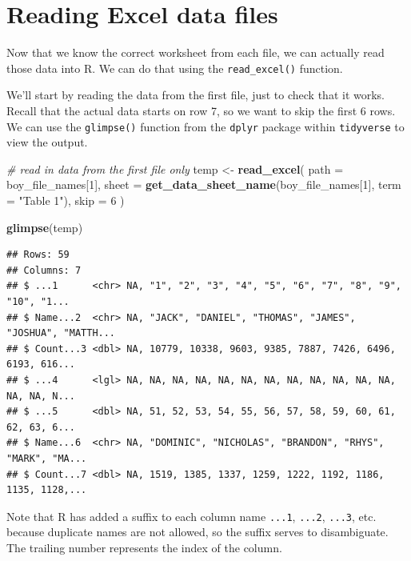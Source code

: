 \documentclass[
]{book}
\newenvironment{Shaded}{\begin{snugshade}}{\end{snugshade}}
\newcommand{\CommentTok}[1]{\textcolor[rgb]{0.56,0.35,0.01}{\textit{#1}}}
\newcommand{\DataTypeTok}[1]{\textcolor[rgb]{0.13,0.29,0.53}{#1}}
\newcommand{\DecValTok}[1]{\textcolor[rgb]{0.00,0.00,0.81}{#1}}
\newcommand{\KeywordTok}[1]{\textcolor[rgb]{0.13,0.29,0.53}{\textbf{#1}}}
\newcommand{\NormalTok}[1]{#1}
\newcommand{\StringTok}[1]{\textcolor[rgb]{0.31,0.60,0.02}{#1}}
\begin{document}
\hypertarget{reading-excel-data-files}{%
\section{Reading Excel data files}\label{reading-excel-data-files}}

Now that we know the correct worksheet from each file, we can actually read those data into R. We can do that using the \texttt{read\_excel()} function.

We'll start by reading the data from the first file, just to check that it works. Recall that the actual data starts on row 7, so we want to skip the first 6 rows. We can use the \texttt{glimpse()} function from the \texttt{dplyr} package within \texttt{tidyverse} to view the output.

\begin{Shaded}
\begin{Highlighting}[]
\CommentTok{\# read in data from the first file only}
\NormalTok{temp \textless{}{-}}\StringTok{ }\KeywordTok{read\_excel}\NormalTok{(}
  \DataTypeTok{path =}\NormalTok{ boy\_file\_names[}\DecValTok{1}\NormalTok{],}
  \DataTypeTok{sheet =} \KeywordTok{get\_data\_sheet\_name}\NormalTok{(boy\_file\_names[}\DecValTok{1}\NormalTok{], }\DataTypeTok{term =} \StringTok{"Table 1"}\NormalTok{),}
  \DataTypeTok{skip =} \DecValTok{6}
\NormalTok{)}

\KeywordTok{glimpse}\NormalTok{(temp)}
\end{Highlighting}
\end{Shaded}

\begin{verbatim}
## Rows: 59
## Columns: 7
## $ ...1      <chr> NA, "1", "2", "3", "4", "5", "6", "7", "8", "9", "10", "1...
## $ Name...2  <chr> NA, "JACK", "DANIEL", "THOMAS", "JAMES", "JOSHUA", "MATTH...
## $ Count...3 <dbl> NA, 10779, 10338, 9603, 9385, 7887, 7426, 6496, 6193, 616...
## $ ...4      <lgl> NA, NA, NA, NA, NA, NA, NA, NA, NA, NA, NA, NA, NA, NA, N...
## $ ...5      <dbl> NA, 51, 52, 53, 54, 55, 56, 57, 58, 59, 60, 61, 62, 63, 6...
## $ Name...6  <chr> NA, "DOMINIC", "NICHOLAS", "BRANDON", "RHYS", "MARK", "MA...
## $ Count...7 <dbl> NA, 1519, 1385, 1337, 1259, 1222, 1192, 1186, 1135, 1128,...
\end{verbatim}

Note that R has added a suffix to each column name \texttt{...1}, \texttt{...2}, \texttt{...3}, etc. because duplicate names are not allowed, so the suffix serves to disambiguate. The trailing number represents the index of the column.
\end{document}
